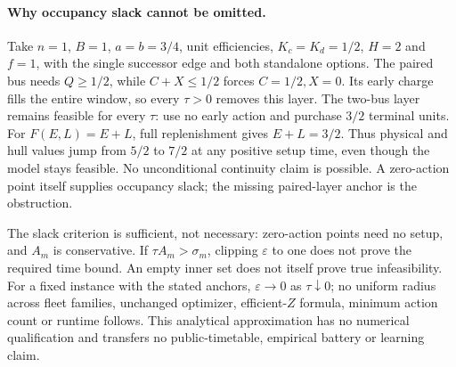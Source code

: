 \paragraph{Why occupancy slack cannot be omitted.}
Take $n=1$, $B=1$, $a=b=3/4$, unit efficiencies,
$K_c=K_d=1/2$, $H=2$ and $f=1$, with the single successor edge and
both standalone options. The paired bus needs $Q\ge1/2$, while
$C+X\le1/2$ forces $C=1/2,X=0$. Its early charge fills the entire
window, so every $\tau>0$ removes this layer. The two-bus layer remains
feasible for every $\tau$: use no early action and purchase $3/2$
terminal units. For $F(E,L)=E+L$, full replenishment gives $E+L=3/2$.
Thus physical and hull values jump from $5/2$ to $7/2$ at any positive
setup time, even though the model stays feasible. No unconditional
continuity claim is possible. A zero-action point itself supplies
occupancy slack; the missing paired-layer anchor is the obstruction.

The slack criterion is sufficient, not necessary: zero-action points need
no setup, and $A_m$ is conservative. If $\tau A_m>\sigma_m$, clipping
$\varepsilon$ to one does not prove the required time bound. An empty inner
set does not itself prove true infeasibility. For a fixed instance with
the stated anchors, $\varepsilon\to0$ as $\tau\downarrow0$; no uniform
radius across fleet families, unchanged optimizer, efficient-$Z$ formula,
minimum action count or runtime follows. This analytical approximation
has no numerical qualification and transfers no public-timetable,
empirical battery or learning claim.
